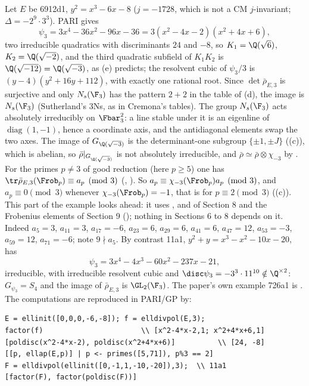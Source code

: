 \begin{example}\label{ex:galois:ns-example}
Let $E$ be 6912d1, $y^2=x^3-6x-8$ ($j=-1728$, which is not a CM $j$-invariant; $\Delta=-2^9\cdot3^3$). PARI gives
\[
\psi_3=3x^4-36x^2-96x-36=3(x^2-4x-2)(x^2+4x+6),
\]
two irreducible quadratics with discriminants $24$ and $-8$, so $K_1=\Q(\sqrt6)$, $K_2=\Q(\sqrt{-2})$, and the third quadratic subfield of $K_1K_2$ is
$\Q(\sqrt{-12})=\Q(\sqrt{-3})$, as (e) predicts; the resolvent cubic of $\psi_3/3$ is $(y-4)(y^2+16y+112)$, with exactly one rational
root. Since $\det\bar\rho_{E,3}$ is surjective and only $N_s(\F_3)$ has the pattern $2+2$ in the table of (d), the image is $N_s(\F_3)$ (Sutherland's 3Ns, as in Cremona's
tables). The group $N_s(\F_3)$ acts absolutely irreducibly on $\Fbar_3^2$: a line
stable under it is an eigenline of $\operatorname{diag}(1,-1)$, hence a coordinate axis, and the antidiagonal elements swap the two axes. The image of
$G_{\Q(\sqrt{-3})}$ is the determinant-one subgroup $\{\pm1,\pm J\}$ ((c)), which is abelian, so $\bar\rho|_{G_{\Q(\sqrt{-3})}}$ is not absolutely
irreducible, and $\bar\rho\simeq\bar\rho\otimes\chi_{-3}$ by . For the primes $p\ne3$ of good reduction (here $p\ge5$) one has
$\tr\bar\rho_{E,3}(\Frob_p)\equiv a_p\pmod3$ (, ). So $a_p\equiv\chi_{-3}(\Frob_p)a_p\pmod3$, and $a_p\equiv0\pmod3$ whenever
$\chi_{-3}(\Frob_p)=-1$, that is for $p\equiv2\pmod 3$ ((c)). This part of the example looks ahead: it uses
,  and  of Section 8 and the Frobenius elements of Section 9
(); nothing in Sections 6 to 8 depends on it. Indeed $a_5=3$, $a_{11}=3$, $a_{17}=-6$, $a_{23}=6$, $a_{29}=6$,
$a_{41}=6$, $a_{47}=12$, $a_{53}=-3$, $a_{59}=12$, $a_{71}=-6$; note $9\nmid a_5$. By contrast 11a1, $y^2+y=x^3-x^2-10x-20$, has
\[
\psi_3=3x^4-4x^3-60x^2-237x-21,
\]
irreducible, with irreducible resolvent cubic and $\disc\psi_3=-3^3\cdot11^{10}\notin\Q^{\times2}$: $G_{\psi_3}=S_4$ and the image of $\bar\rho_{E,3}$ is $\GL_2(\F_3)$. The paper's own
example 726a1 is .
The computations are reproduced in PARI/GP by:
\begin{lstlisting}[language=GP]
E = ellinit([0,0,0,-6,-8]); f = elldivpol(E,3);
factor(f)                       \\ [x^2-4*x-2,1; x^2+4*x+6,1]
[poldisc(x^2-4*x-2), poldisc(x^2+4*x+6)]          \\ [24, -8]
[[p, ellap(E,p)] | p <- primes([5,71]), p%3 == 2]
F = elldivpol(ellinit([0,-1,1,-10,-20]),3);  \\ 11a1
[factor(F), factor(poldisc(F))]
\end{lstlisting}
\end{example}


